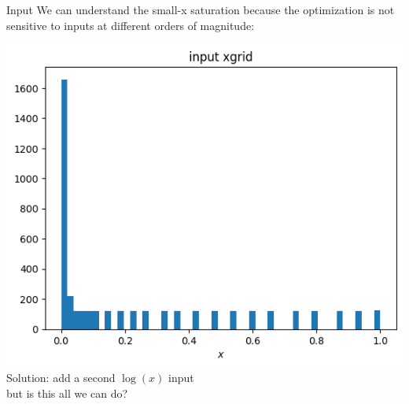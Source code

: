 \documentclass[aspectratio=169, 8pt,t]{beamer}
\begin{document}
\begin{frame}{Input}
  We can understand the small-x saturation because the optimization is not sensitive to inputs at different orders of magnitude:
  \begin{center}
    \includegraphics[height=0.55\textheight]{unscaledxgrid.png} \\
    Solution: add a second $\log(x)$ input \\
    but is this all we can do?
  \end{center}
\end{frame}
\end{document}
